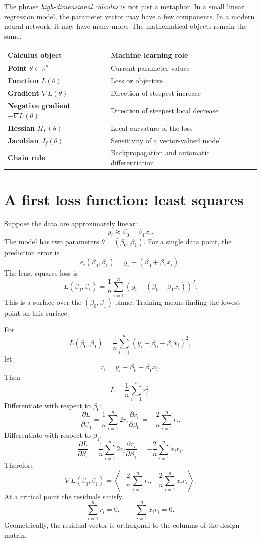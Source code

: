 \documentclass[11pt,oneside]{book}
\newcommand{\R}{\mathbb R}
\newcommand{\grad}{\nabla}
\begin{document}
The phrase \emph{high-dimensional calculus} is not just a metaphor. In a small linear regression model, the parameter vector may have a few components. In a modern neural network, it may have many more. The mathematical objects remain the same.

\begin{center}
\begin{tabularx}{0.96\textwidth}{>{\bfseries}p{}X}
\toprule
Calculus object & Machine learning role \\
\midrule
Point $\theta\in\R^p$ & Current parameter values \\
Function $L(\theta)$ & Loss or objective \\
Gradient $\grad L(\theta)$ & Direction of steepest increase \\
Negative gradient $-\grad L(\theta)$ & Direction of steepest local decrease \\
Hessian $H_L(\theta)$ & Local curvature of the loss \\
Jacobian $J_f(\theta)$ & Sensitivity of a vector-valued model \\
Chain rule & Backpropagation and automatic differentiation \\
\bottomrule
\end{tabularx}
\end{center}

\section{A first loss function: least squares}

Suppose the data are approximately linear:
\[
y_i\approx \beta_0+\beta_1x_i.
\]
The model has two parameters $\theta=(\beta_0,\beta_1)$. For a single data point, the prediction error is
\[
e_i(\beta_0,\beta_1)=y_i-(\beta_0+\beta_1x_i).
\]
The least-squares loss is
\[
L(\beta_0,\beta_1)=\frac1n\sum_{i=1}^n\left(y_i-(\beta_0+\beta_1x_i)\right)^2.
\]
This is a surface over the $(\beta_0,\beta_1)$-plane. Training means finding the lowest point on this surface.

\begin{examplebox}
For
\[
L(\beta_0,\beta_1)=\frac1n\sum_{i=1}^n\left(y_i-\beta_0-\beta_1x_i\right)^2,
\]
let
\[
r_i=y_i-\beta_0-\beta_1x_i.
\]
Then
\[
L=\frac1n\sum_{i=1}^n r_i^2.
\]
Differentiate with respect to $\beta_0$:
\[
\frac{\partial L}{\partial\beta_0}
=\frac1n\sum_{i=1}^n2r_i\frac{\partial r_i}{\partial\beta_0}
=-\frac2n\sum_{i=1}^n r_i.
\]
Differentiate with respect to $\beta_1$:
\[
\frac{\partial L}{\partial\beta_1}
=\frac1n\sum_{i=1}^n2r_i\frac{\partial r_i}{\partial\beta_1}
=-\frac2n\sum_{i=1}^n x_i r_i.
\]
Therefore
\[
\grad L(\beta_0,\beta_1)=\left\langle
-\frac2n\sum_{i=1}^n r_i,
-\frac2n\sum_{i=1}^n x_i r_i
\right\rangle.
\]
At a critical point the residuals satisfy
\[
\sum_{i=1}^n r_i=0,\qquad \sum_{i=1}^n x_i r_i=0.
\]
Geometrically, the residual vector is orthogonal to the columns of the design matrix.
\end{examplebox}
\end{document}
